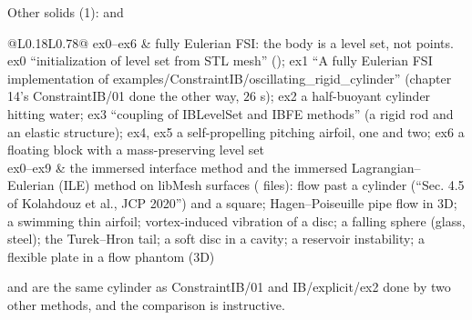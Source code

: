 \documentclass[aspectratio=169,11pt]{beamer}
\begin{document}
\begin{frame}{Other solids (1):  and }
\label{fr:others}
\scriptsize
\setlength{\tabcolsep}{3pt}
\begin{tabular}{@{}L{0.18\textwidth}L{0.78\textwidth}@{}}
\toprule
{} ex0--ex6 & fully Eulerian FSI: the body is a level set, not points. ex0 ``initialization of level set from STL mesh'' (); ex1 ``A fully Eulerian FSI implementation of examples/ConstraintIB/oscillating\_rigid\_cylinder'' (chapter 14's ConstraintIB/01 done the other way, $26$ s); ex2 a half-buoyant cylinder hitting water; ex3 ``coupling of IBLevelSet and IBFE methods'' (a rigid rod and an elastic structure); ex4, ex5 a self-propelling pitching airfoil, one and two; ex6 a floating block with a mass-preserving level set\\
 ex0--ex9 & the immersed interface method and the immersed Lagrangian--Eulerian (ILE) method on libMesh surfaces ( files): flow past a cylinder (``Sec. 4.5 of Kolahdouz et al., JCP 2020'') and a square; Hagen--Poiseuille pipe flow in 3D; a swimming thin airfoil; vortex-induced vibration of a disc; a falling sphere (glass, steel); the Turek--Hron tail; a soft disc in a cavity; a reservoir instability; a flexible plate in a flow phantom (3D)\\
\bottomrule
\end{tabular}
\vspace{1mm}

\scriptsize {} and  are the same cylinder as ConstraintIB/01 and IB/explicit/ex2 done by two other methods, and the comparison is instructive.
\end{frame}
\end{document}
